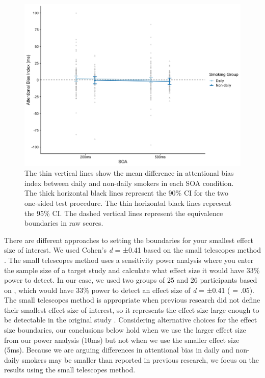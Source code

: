 \documentclass[empirical, authordate]{jote-new-article}
\begin{document}
\begin{figure}


  \begin{fullwidth}

    \includegraphics[width=\linewidth]{media/image4.jpeg}
    \caption{
      The thin vertical lines show the mean difference in attentional bias index between daily and non-daily smokers in each SOA condition. The thick horizontal black lines represent the 90\% CI for the two one-sided test procedure. The thin horizontal black lines represent the 95\% CI. The dashed vertical lines represent the equivalence boundaries in raw scores.}
    \label{fig:4}

  \end{fullwidth}


\end{figure}
There are different approaches to setting the boundaries for your smallest effect size of interest. We used Cohen's \emph{d} = ±0.41 based on the small telescopes method \parencite{Lakens2018}. The small telescopes method uses a sensitivity power analysis where you enter the sample size of a target study and calculate what effect size it would have 33\% power to detect. In our case, we used two groups of 25 and 26 participants based on \parencite{Vollstädt-Klein2011}, which would have 33\% power to detect an effect size of \emph{d} = ±0.41 (\emph{} = .05). The small telescopes method is appropriate when previous research did not define their smallest effect size of interest, so it represents the effect size large enough to be detectable in the original study \parencite{Simonsohn2015}. Considering alternative choices for the effect size boundaries, our conclusions below hold when we use the larger effect size from our power analysis (10ms) but not when we use the smaller effect size (5ms). Because we are arguing differences in attentional bias in daily and non-daily smokers may be smaller than reported in previous research, we focus on the results using the small telescopes method.
\end{document}
